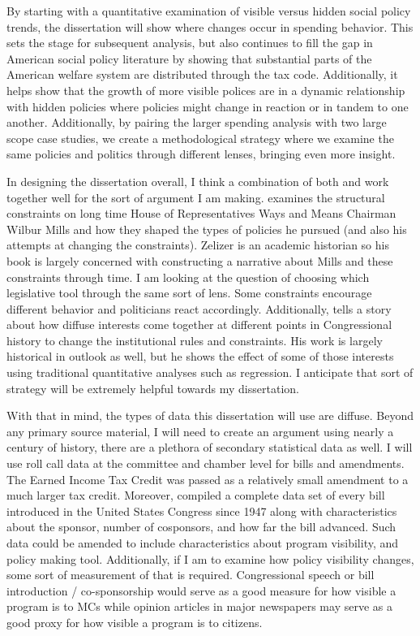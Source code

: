 \documentclass[12pt]{article}
\begin{document}
By starting with a quantitative examination of visible versus hidden social policy trends, the dissertation will show where changes occur in spending behavior. This sets the stage for subsequent analysis, but also continues to fill the gap in American social policy literature by showing that substantial parts of the American welfare system are distributed through the tax code. Additionally, it helps show that the growth of more visible polices are in a dynamic relationship with hidden policies where policies might change in reaction or in tandem to one another. Additionally, by pairing the larger spending analysis with two large scope case studies, we create a methodological strategy where we examine the same policies and politics through different lenses, bringing even more insight.

In designing the dissertation overall, I think a combination of both \cite{zelizer1998} and \cite{schickler2001} work together well for the sort of argument I am making. \cite{zelizer1998} examines the structural constraints on long time House of Representatives Ways and Means Chairman Wilbur Mills and how they shaped the types of policies he pursued (and also his attempts at changing the constraints). Zelizer is an academic historian so his book is largely concerned with constructing a narrative about Mills and these constraints through time. I am looking at the question of choosing which legislative tool through the same sort of lens. Some constraints encourage different behavior and politicians react accordingly. Additionally, \cite{schickler2001} tells a story about how diffuse interests come together at different points in Congressional history to change the institutional rules and constraints. His work is largely historical in outlook as well, but he shows the effect of some of those interests using traditional quantitative analyses such as regression. I anticipate that sort of strategy will be extremely helpful towards my dissertation.

With that in mind, the types of data this dissertation will use are diffuse. Beyond any primary source material, I will need to create an argument using nearly a century of history, there are a plethora of secondary statistical data as well. I will use roll call data at the committee and chamber level for bills and amendments. The Earned Income Tax Credit was passed as a relatively small amendment to a much larger tax credit. Moreover, \cite{adler2012} compiled a complete data set of every bill introduced in the United States Congress since 1947 along with characteristics about the sponsor, number of cosponsors, and how far the bill advanced. Such data could be amended to include characteristics about program visibility, and policy making tool. Additionally, if I am to examine how policy visibility changes, some sort of measurement of that is required. Congressional speech or bill introduction / co-sponsorship would serve as a good measure for how visible a program is to MCs while opinion articles in major newspapers may serve as a good proxy for how visible a program is to citizens. 
\end{document}
